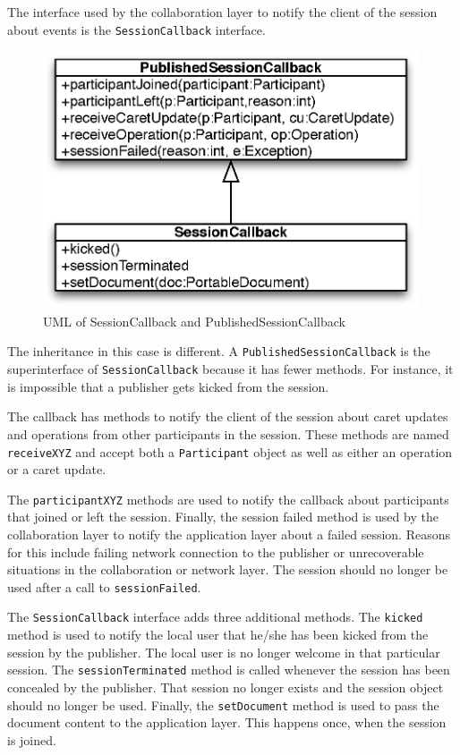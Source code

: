 The interface used by the collaboration layer to notify the client of the
session about events is the \texttt{SessionCallback} interface.

\begin{figure}[H]
 \centering
 \includegraphics[width=11.11cm,height=7.62cm]{../images/design/collaboration-uml-sessioncallback.eps}
 \caption{UML of SessionCallback and PublishedSessionCallback}
 \label{fig:session callback interface}
\end{figure}

The inheritance in this case is different. A \texttt{PublishedSessionCallback}
is the superinterface of \texttt{SessionCallback} because it has fewer
methods. For instance, it is impossible that a publisher gets kicked from
the session.

The callback has methods to notify the client of the session about caret
updates and operations from other participants in the session. These methods
are named \texttt{receiveXYZ} and accept both a \texttt{Participant} object
as well as either an operation or a caret update.

The \texttt{participantXYZ} methods are used to notify the callback about
participants that joined or left the session. Finally, the session failed
method is used by the collaboration layer to notify the application layer
about a failed session. Reasons for this include failing network connection
to the publisher or unrecoverable situations in the collaboration or network
layer. The session should no longer be used after a call to 
\texttt{sessionFailed}.

The \texttt{SessionCallback} interface adds three additional methods. The
\texttt{kicked} method is used to notify the local user that he/she has
been kicked from the session by the publisher. The local user is no longer
welcome in that particular session. The \texttt{sessionTerminated} method
is called whenever the session has been concealed by the publisher. That
session no longer exists and the session object should no longer be used.
Finally, the \texttt{setDocument} method is used to pass the document
content to the application layer. This happens once, when the session is
joined.


